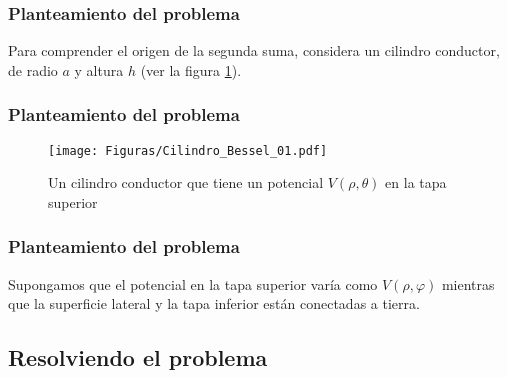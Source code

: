 \documentclass[12pt]{beamer}
\begin{document}
\begin{frame}
\frametitle{Planteamiento del problema}
Para comprender el origen de la segunda suma, considera un cilindro conductor, de radio $a$ y altura $h$ (ver la figura \ref{fig:figura_27_01}).
\end{frame}
\begin{frame}
\frametitle{Planteamiento del problema}
\vspace*{-0.5cm}
\begin{figure}[H]
    \centering
    \texttt{[image: Figuras/Cilindro\_Bessel\_01.pdf]}
    \caption{Un cilindro conductor que tiene un potencial $V (\rho, \theta)$ en la tapa superior}%
    \label{fig:figura_27_01}
\end{figure}
\end{frame}
\begin{frame}
\frametitle{Planteamiento del problema}
Supongamos que el potencial en la tapa superior varía como $V (\rho, \varphi)$ mientras que la superficie lateral y la tapa inferior están conectadas a tierra.
\end{frame}

\subsection{Resolviendo el problema}
\end{document}
